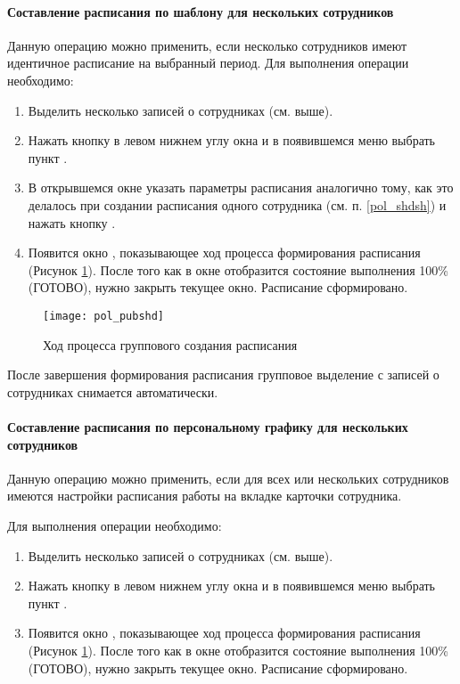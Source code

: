 \paragraph{Составление расписания по шаблону для нескольких сотрудников}

Данную операцию можно применить, если несколько сотрудников имеют идентичное расписание на выбранный период. Для выполнения операции необходимо:
\begin{enumerate}
 \item Выделить несколько записей о сотрудниках (см. выше).
 \item Нажать кнопку   в левом нижнем углу окна и в появившемся меню выбрать пункт .
 \item В открывшемся окне указать параметры расписания аналогично тому, как это делалось при создании расписания одного сотрудника (см. п. \ref{pol_shdsh}) и нажать кнопку  .
 \item Появится окно , показывающее ход процесса формирования расписания (Рисунок \ref{img_pol_pubshd}). После того как в окне отобразится состояние выполнения 100\% (ГОТОВО), нужно закрыть текущее окно. Расписание сформировано.
\end{enumerate}

\begin{figure}[ht]\centering
 \texttt{[image: pol\_pubshd]}
 \caption{Ход процесса группового создания расписания}
 \label{img_pol_pubshd}
\end{figure} 
 
\begin{vnim}
 После завершения формирования расписания групповое выделение с записей о сотрудниках снимается автоматически.
\end{vnim}

\paragraph{Составление расписания по персональному графику для нескольких сотрудников}

Данную операцию можно применить, если для всех или нескольких сотрудников имеются настройки расписания работы на вкладке  карточки сотрудника.

Для выполнения операции необходимо:
\begin{enumerate}
 \item Выделить несколько записей о сотрудниках (см. выше).
 \item Нажать кнопку   в левом нижнем углу окна и в появившемся меню выбрать пункт .
 \item Появится окно , показывающее ход процесса формирования расписания (Рисунок \ref{img_pol_pubshd}). После того как в окне отобразится состояние выполнения 100\% (ГОТОВО), нужно закрыть текущее окно. Расписание сформировано.
\end{enumerate}
 
